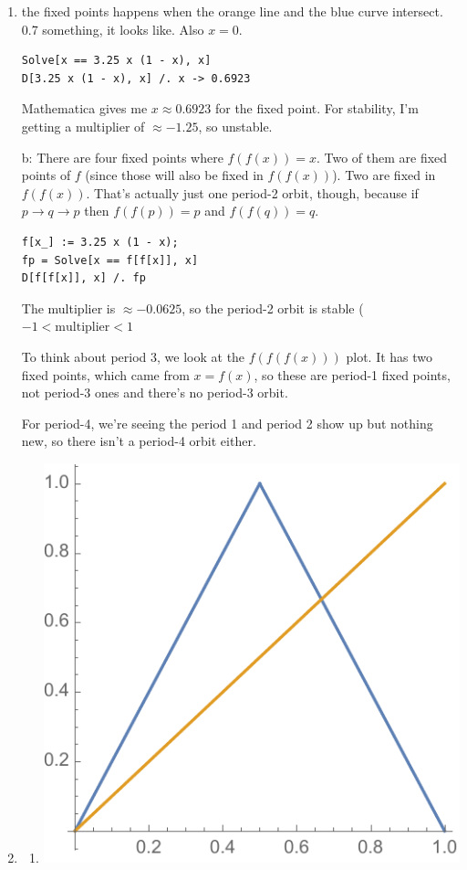 \documentclass[12pt,letterpaper,noanswers]{exam}
\begin{document}
\eject

\begin{enumerate}
\item the fixed points happens when the orange line and the blue curve intersect.  0.7 something, it looks like.  Also $x = 0$.
\begin{verbatim}
Solve[x == 3.25 x (1 - x), x]
D[3.25 x (1 - x), x] /. x -> 0.6923
\end{verbatim}
Mathematica gives me $x \approx 0.6923$ for the fixed point.
For stability, I'm getting a multiplier of $\approx -1.25$, so unstable.

b: There are four fixed points where $f(f(x))=x$.  Two of them are fixed points of $f$ (since those will also be fixed in $f(f(x))$).  Two are fixed in $f(f(x))$.  That's actually just one period-2 orbit, though, because if $p\rightarrow q \rightarrow p$ then $f(f(p)) = p$ and $f(f(q))=q$.

\begin{verbatim}
f[x_] := 3.25 x (1 - x);
fp = Solve[x == f[f[x]], x]
D[f[f[x]], x] /. fp
\end{verbatim}

The multiplier is $\approx -0.0625$, so the period-2 orbit is stable ($-1 < \text{multiplier} < 1$

To think about period $3$, we look at the $f(f(f(x)))$ plot.  It has two fixed points, which came from $ x= f(x)$, so these are period-1 fixed points, not period-3 ones and there's no period-3 orbit.

For period-4, we're seeing the period 1 and period 2 show up but nothing new, so there isn't a period-4 orbit either.

\item
\begin{enumerate}
\item  \includegraphics[scale=0.5]{img/C20map1.pdf} 


\end{enumerate}
\end{enumerate}
\end{document}
